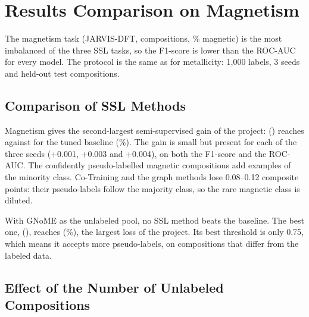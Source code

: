\clearpage
\section{Results Comparison on Magnetism}

The magnetism task (JARVIS-DFT, \MagN{} compositions, \MagPos{}\% magnetic) is the most
imbalanced of the three SSL tasks, so the F1-score is lower than the ROC-AUC for every model.
The protocol is the same as for metallicity: 1,000 labels, 3 seeds and \MagInNTest{} held-out
test compositions.

\subsection*{Comparison of SSL Methods}



Magnetism gives the second-largest semi-supervised gain of the project: \MagInBestMethod{}
(\texttt{\MagInBestConfig}) reaches \MagInBestComp{} against \MagInBaseComp{} for the tuned
\MagInBaseConfig{} baseline (\MagInImpr\%). The gain is small but present for each
of the three seeds (+0.001, +0.003 and +0.004), on both the F1-score and the ROC-AUC. The
confidently pseudo-labelled magnetic compositions add examples of the minority class.
Co-Training and the graph methods lose 0.08--0.12 composite points: their pseudo-labels follow
the majority class, so the rare magnetic class is diluted.

With GNoME as the unlabeled pool, no SSL method beats the baseline. The best one,
\MagGnBestSSL{} (\texttt{\MagGnBestSSLConfig}), reaches \MagGnBestSSLComp{}
(\MagGnImpr\%), the largest loss of the project. Its best threshold is only 0.75, which
means it accepts more pseudo-labels, on compositions that differ from the labeled data.

\subsection*{Effect of the Number of Unlabeled Compositions}


